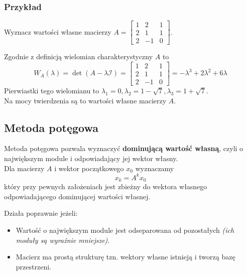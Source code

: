 \documentclass[../mn-notatki.tex]{subfiles}
\begin{document}
\subsubsection{Przykład}

Wyznacz wartości własne macierzy $A = \left[ \begin{smallmatrix}
1 & 2 & 1\\
2 & 1 & 1\\
2 & -1 & 0
\end{smallmatrix} \right]$.

Zgodnie z definicją wielomian charakterystyczny $A$ to
\[
W_A(\lambda) = \det(A - \lambda \mathcal{I}) =
\left[ \begin{smallmatrix}
1 & 2 & 1\\
2 & 1 & 1\\
2 & -1 & 0
\end{smallmatrix} \right]
=
-\lambda^3 + 2\lambda^2 + 6\lambda
\]
Pierwiastki tego wielomianu to $\lambda_1 = 0, \lambda_2 = 1 - \sqrt{7},
\lambda_3 = 1 + \sqrt{7}$. \\
Na mocy twierdzenia są to wartości własne macierzy $A$.

\subsection{Metoda potęgowa}

\begin{tcolorbox}
Metoda potęgowa pozwala wyznaczyć \textbf{dominującą wartość własną}, czyli
o największym module i odpowiadający jej wektor własny.\\

Dla macierzy $A$ i wektor początkowego $x_0$ wyznaczamy
\[
x_k = A^k x_0
\]
który przy pewnych założeniach jest zbieżny do wektora własnego odpowiadającego
dominującej wartości własnej.
\end{tcolorbox}
\begin{tcolorbox}
Działa poprawnie jeżeli:
\begin{itemize}
    \item Wartość o największym module jest odseparowana od pozostałych
    \textit{(ich moduły są wyraźnie mniejsze)}.
    \item Macierz ma prostą strukturę tzn. wektory własne istnieją i tworzą
    bazę przestrzeni.
\end{itemize}
\end{tcolorbox}
\end{document}
